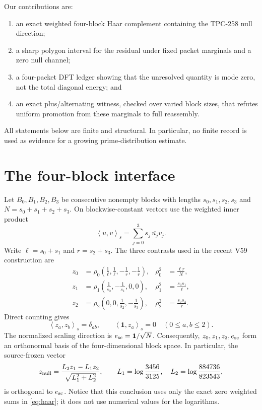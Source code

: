 \documentclass[11pt]{article}
\theoremstyle{definition}
\newcommand{\ip}[2]{\left\langle #1,#2\right\rangle}
\begin{document}
Our contributions are:
\begin{enumerate}
 \item an exact weighted four-block Haar complement containing the TPC-258 null
       direction;
 \item a sharp polygon interval for the residual under fixed packet marginals and
       a zero null channel;
 \item a four-packet DFT ledger showing that the unresolved quantity is mode zero,
       not the total diagonal energy; and
 \item an exact plus/alternating witness, checked over varied block sizes, that
       refutes uniform promotion from these marginals to full reassembly.
\end{enumerate}

All statements below are finite and structural.  In particular, no finite record
is used as evidence for a growing prime-distribution estimate.

\section{The four-block interface}

Let $B_0,B_1,B_2,B_3$ be consecutive nonempty blocks with lengths
$s_0,s_1,s_2,s_3$ and $N=s_0+s_1+s_2+s_3$.  On blockwise-constant vectors use
the weighted inner product
\[
 \ip{u}{v}_s=\sum_{j=0}^3s_j\,\overline{u_j}v_j.
\]
Write $\ell=s_0+s_1$ and $r=s_2+s_3$.  The three contrasts used in the recent
V59 construction are
\begin{align*}
 z_0&=\rho_0\left(\frac1\ell,\frac1\ell,-\frac1r,-\frac1r\right),
 &\rho_0^2&=\frac{\ell r}{N},\\
 z_1&=\rho_1\left(\frac1{s_0},-\frac1{s_1},0,0\right),
 &\rho_1^2&=\frac{s_0s_1}{\ell},\\
 z_2&=\rho_2\left(0,0,\frac1{s_2},-\frac1{s_3}\right),
 &\rho_2^2&=\frac{s_2s_3}{r}.
\end{align*}
Direct counting gives
\begin{equation}
 \ip{z_a}{z_b}_s=\delta_{ab},\qquad
 \ip{\boldsymbol 1}{z_a}_s=0 \quad (0\leq a,b\leq2).
 \label{eq:haar}
\end{equation}
The normalized scaling direction is $e_{\rm sc}=\boldsymbol 1/\sqrt N$.
Consequently, $z_0,z_1,z_2,e_{\rm sc}$ form an orthonormal basis of the
four-dimensional block space.  In particular, the source-frozen vector
\begin{equation}
 z_{\rm null}=\frac{L_2z_1-L_1z_2}{\sqrt{L_1^2+L_2^2}},\qquad
 L_1=\log\frac{3456}{3125},\quad
 L_2=\log\frac{884736}{823543},
 \label{eq:null}
\end{equation}
is orthogonal to $e_{\rm sc}$.  Notice that this conclusion uses only the exact
zero weighted sums in \eqref{eq:haar}; it does not use numerical values for the
logarithms.
\end{document}
